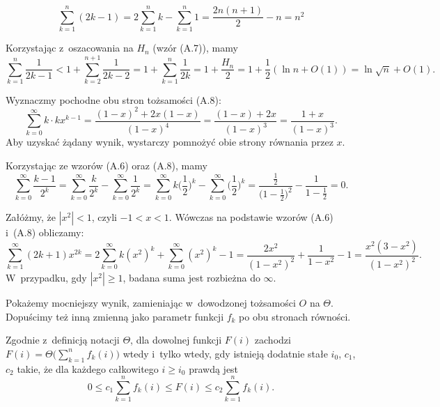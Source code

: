 
\exercise %
\[
	\sum_{k=1}^n(2k-1) = 2\sum_{k=1}^nk-\sum_{k=1}^n1 = \frac{2n(n+1)}{2}-n = n^2
\]

\exercise %
Korzystając z~oszacowania na $H_n$ (wzór (A.7)), mamy
\[
    \sum_{k=1}^n\frac{1}{2k-1} < 1+\sum_{k=2}^{n+1}\frac{1}{2k-2} = 1+\sum_{k=1}^n\frac{1}{2k} = 1+\frac{H_n}{2} = 1+\frac{1}{2}(\ln n+O(1)) = \ln\sqrt{n}+O(1).
\]

\exercise %
Wyznaczmy pochodne obu stron tożsamości (A.8):
\[
	\sum_{k=0}^\infty k\cdot kx^{k-1} = \frac{(1-x)^2+2x(1-x)}{(1-x)^4} = \frac{(1-x)+2x}{(1-x)^3} = \frac{1+x}{(1-x)^3}.
\]
Aby uzyskać żądany wynik, wystarczy pomnożyć obie strony równania przez $x$.

\exercise %
Korzystając ze wzorów (A.6) oraz (A.8), mamy
\[
	\sum_{k=0}^\infty\frac{k-1}{2^k} = \sum_{k=0}^\infty\frac{k}{2^k}-\sum_{k=0}^\infty\frac{1}{2^k} = \sum_{k=0}^\infty k\biggl(\frac{1}{2}\biggr)^k-\sum_{k=0}^\infty\biggl(\frac{1}{2}\biggr)^k = \frac{\frac{1}{2}}{\bigl(1-\frac{1}{2}\bigr)^2}-\frac{1}{1-\frac{1}{2}} = 0.
\]

\exercise %
Załóżmy, że $|x^2|<1$, czyli $-1<x<1$.
Wówczas na podstawie wzorów (A.6) i~(A.8) obliczamy:
\[
	\sum_{k=1}^\infty(2k+1)x^{2k} = 2\sum_{k=0}^\infty k(x^2)^k+\sum_{k=0}^\infty(x^2)^k-1 = \frac{2x^2}{(1-x^2)^2}+\frac{1}{1-x^2}-1 = \frac{x^2(3-x^2)}{(1-x^2)^2}.
\]
W~przypadku, gdy $|x^2|\ge1$, badana suma jest rozbieżna do $\infty$.

\exercise %
Pokażemy mocniejszy wynik, zamieniając w~dowodzonej tożsamości $O$ na $\Theta$.
Dopuścimy też inną zmienną jako parametr funkcji $f_k$ po obu stronach równości.

Zgodnie z~definicją notacji $\Theta$, dla dowolnej funkcji $F(i)$ zachodzi $F(i)=\Theta\bigl(\sum_{k=1}^nf_k(i)\bigr)$ wtedy i~tylko wtedy, gdy istnieją dodatnie stałe $i_0$, $c_1$, $c_2$ takie, że dla każdego całkowitego $i\ge i_0$ prawdą jest
\[
	0 \le c_1\sum_{k=1}^nf_k(i) \le F(i) \le c_2\sum_{k=1}^nf_k(i).
\]

